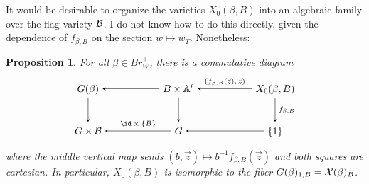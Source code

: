 \documentclass[a4paper,10pt,leqno]{amsart}
\theoremstyle{plain}
\theoremstyle{plain}
\theoremstyle{plain}
\newtheorem{prop}[thm]{Proposition}
\theoremstyle{definition}
\theoremstyle{remark}
\newcommand{\Br}{\mathit{Br}}
\begin{document}
It would be desirable to organize the varieties $X_0(\beta, B)$ into an algebraic family over the flag variety $\cal{B}$.
I do not know how to do this directly, given the dependence of $f_{\beta, B}$ on the section $w \mapsto w_T$.
Nonetheless:

\begin{prop}
For all $\beta \in \Br_W^+$, there is a commutative diagram
\begin{equation}
\begin{tikzpicture}[baseline=(current bounding box.center), >=stealth]
\matrix(m)[matrix of math nodes, row sep=2.5em, column sep=5.5em, text height=2ex, text depth=0.5ex]
{	G(\beta)
		&B \times \bb{A}^\ell
		&X_0(\beta, B)\\
	G \times \cal{B}
		&G
		&\{1\}\\
		};
\path[->,font=\scriptsize, auto]
(m-1-2)		edge (m-1-1)
(m-1-3) 	edge node[above]{$(f_{\beta, B}(\vec{z}), \vec{z})$} (m-1-2)
(m-1-1)		edge (m-2-1)
(m-1-2)		edge (m-2-2)
(m-1-3) 	edge node{$f_{\beta, B}$} (m-2-3)
(m-2-2)		edge node[above]{$\id \times \{B\}$} (m-2-1)
(m-2-3)		edge (m-2-2);
\end{tikzpicture}
\end{equation}
where the middle vertical map sends $(b, \vec{z}) \mapsto b^{-1} f_{\beta, B}(\vec{z})$ and both squares are cartesian.
In particular, $X_0(\beta, B)$ is isomorphic to the fiber $G(\beta)_{1, B} = \cal{X}(\beta)_B$.
\end{prop}
\end{document}
